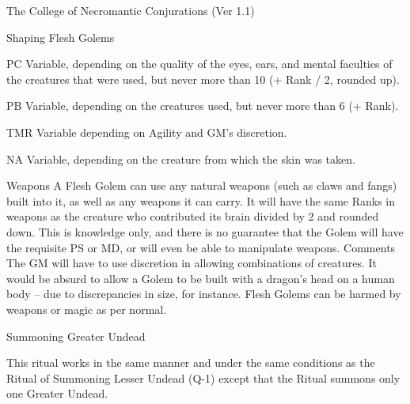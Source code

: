 \begin{Chapter}{The College of Necromantic Conjurations (Ver 1.1)}
\begin{ritual}[R-4]{Shaping Flesh Golems}
\begin{effects}
\begin{Description}
\item[PC] Variable, depending on the quality of the eyes, ears, and
  mental faculties of the creatures that were used, but never more
  than 10 (+ Rank / 2, rounded up).

\item[PB] Variable, depending on the creatures used, but never more
  than 6 (+ Rank).

\item[TMR] Variable depending on Agility and GM’s discretion.

\item[NA] Variable, depending on the creature from which the skin was
  taken.

\item[Weapons] A Flesh Golem can use any natural weapons (such as
  claws and fangs) built into it, as well as any weapons it can
  carry. It will have the same Ranks in weapons as the creature who
  contributed its brain divided by 2 and rounded down.  This is
  knowledge only, and there is no guarantee that the Golem will have
  the requisite PS or MD, or will even be able to manipulate weapons.
  Comments The GM will have to use discretion in allowing combinations
  of creatures.  It would be absurd to allow a Golem to be built with
  a dragon’s head on a human body – due to discrepancies in size, for
  instance. Flesh Golems can be harmed by weapons or magic as per
  normal.
\end{Description}

\end{effects}
\end{ritual}

\begin{ritual}[R-5]{Summoning Greater Undead}

\begin{effects}
This ritual works in the same manner and under the same conditions as
the Ritual of Summoning Lesser Undead (Q-1) except that the Ritual
summons only one Greater Undead.
\end{effects}
\end{ritual}

\end{Chapter}
